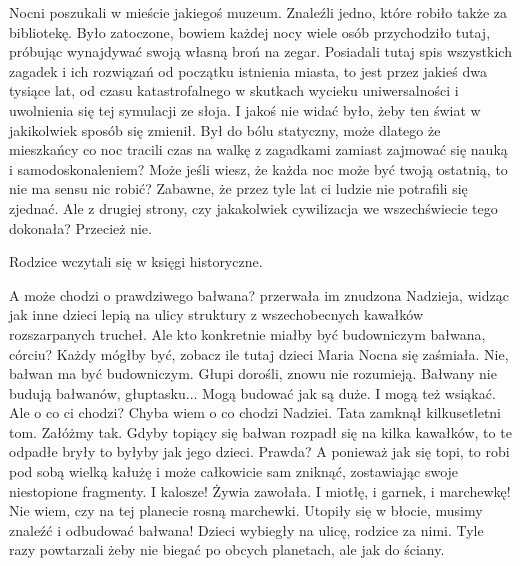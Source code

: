
Nocni poszukali w mieście jakiegoś muzeum.
Znaleźli jedno, które robiło także za bibliotekę.
Było zatoczone, bowiem każdej nocy wiele osób przychodziło tutaj, próbując wynajdywać swoją własną broń na zegar.
Posiadali tutaj spis wszystkich zagadek i ich rozwiązań od początku istnienia miasta, to jest przez jakieś dwa tysiące lat, od czasu katastrofalnego w skutkach wycieku uniwersalności i uwolnienia się tej symulacji ze słoja.
I jakoś nie widać było, żeby ten świat w jakikolwiek sposób się zmienił. 
Był do bólu statyczny, może dlatego że mieszkańcy co noc tracili czas na walkę z zagadkami zamiast zajmować się nauką i samodoskonaleniem?
Może jeśli wiesz, że każda noc może być twoją ostatnią, to nie ma sensu nic robić?
Zabawne, że przez tyle lat ci ludzie nie potrafili się zjednać.
Ale z drugiej strony, czy jakakolwiek cywilizacja we wszechświecie tego dokonała? Przecież nie.

Rodzice wczytali się w księgi historyczne.
\begin{dialogue}
	\ds{} A może chodzi o prawdziwego bałwana? \dm{} przerwała im znudzona Nadzieja, widząc jak inne dzieci lepią na ulicy struktury z wszechobecnych kawałków rozszarpanych trucheł.
	\ds{} Ale kto konkretnie miałby być budowniczym bałwana, córciu? Każdy mógłby być, zobacz ile tutaj dzieci \dm{} Maria Nocna się zaśmiała.
	\ds{} Nie, bałwan ma być budowniczym.
		\dm{} Głupi dorośli, znowu nie rozumieją.
	\ds{} Bałwany nie budują bałwanów, głuptasku...
	\ds{} Mogą budować jak są duże. I mogą też wsiąkać.
	\ds{} Ale o co ci chodzi?
	\ds{} Chyba wiem o co chodzi Nadziei. 
		\dm{} Tata zamknął kilkusetletni tom. 
		\dm{} Załóżmy tak. Gdyby topiący się bałwan rozpadł się na kilka kawałków, to te odpadłe bryły to byłyby jak jego dzieci. Prawda? A ponieważ jak się topi, to robi pod sobą wielką kałużę i może całkowicie sam zniknąć, zostawiając swoje niestopione fragmenty.
	\ds{} I kalosze! \dm{} Żywia zawołała. \dm{} I miotłę, i garnek, i marchewkę!
	\ds{} Nie wiem, czy na tej planecie rosną marchewki.
	\ds{} Utopiły się w błocie, musimy znaleźć i odbudować bałwana! \dm{} Dzieci wybiegły na ulicę, rodzice za nimi. Tyle razy powtarzali żeby nie biegać po obcych planetach, ale jak do ściany.
\end{dialogue}

